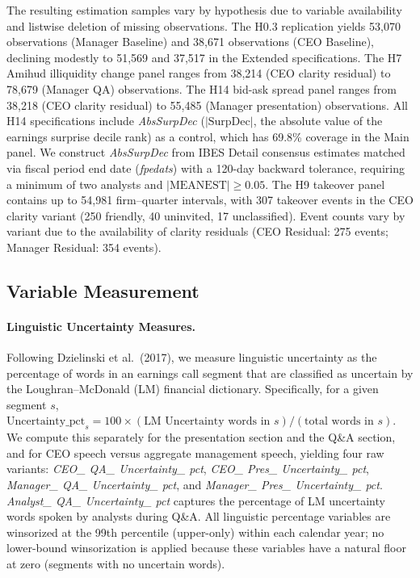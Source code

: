 \documentclass[12pt,a4paper]{article}
\begin{document}
The resulting estimation samples vary by hypothesis due to variable availability and listwise deletion of missing observations. The H0.3 replication yields 53,070 observations (Manager Baseline) and 38,671 observations (CEO Baseline), declining modestly to 51,569 and 37,517 in the Extended specifications. The H7 Amihud illiquidity change panel ranges from 38,214 (CEO clarity residual) to 78,679 (Manager QA) observations. The H14 bid-ask spread panel ranges from 38,218 (CEO clarity residual) to 55,485 (Manager presentation) observations. All H14 specifications include \textit{AbsSurpDec} ($|\text{SurpDec}|$, the absolute value of the earnings surprise decile rank) as a control, which has 69.8\% coverage in the Main panel. We construct \textit{AbsSurpDec} from IBES Detail consensus estimates matched via fiscal period end date (\textit{fpedats}) with a 120-day backward tolerance, requiring a minimum of two analysts and $|\text{MEANEST}| \geq 0.05$. The H9 takeover panel contains up to 54,981 firm--quarter intervals, with 307 takeover events in the CEO clarity variant (250 friendly, 40 uninvited, 17 unclassified). Event counts vary by variant due to the availability of clarity residuals (CEO Residual: 275 events; Manager Residual: 354 events).

\subsection{Variable Measurement}
\label{sec:variables}

\paragraph{Linguistic Uncertainty Measures.}
Following Dzielinski et al.\ (2017), we measure linguistic uncertainty as the percentage of words in an earnings call segment that are classified as uncertain by the Loughran--McDonald (LM) financial dictionary. Specifically, for a given segment $s$, $\text{Uncertainty\_pct}_s = 100 \times (\text{LM Uncertainty words in } s) / (\text{total words in } s)$. We compute this separately for the presentation section and the Q\&A section, and for CEO speech versus aggregate management speech, yielding four raw variants: \textit{CEO\_ QA\_ Uncertainty\_ pct}, \textit{CEO\_ Pres\_ Uncertainty\_ pct}, \textit{Manager\_ QA\_ Uncertainty\_ pct}, and \textit{Manager\_ Pres\_ Uncertainty\_ pct}. \textit{Analyst\_ QA\_ Uncertainty\_ pct} captures the percentage of LM uncertainty words spoken by analysts during Q\&A. All linguistic percentage variables are winsorized at the 99th percentile (upper-only) within each calendar year; no lower-bound winsorization is applied because these variables have a natural floor at zero (segments with no uncertain words).
\end{document}
